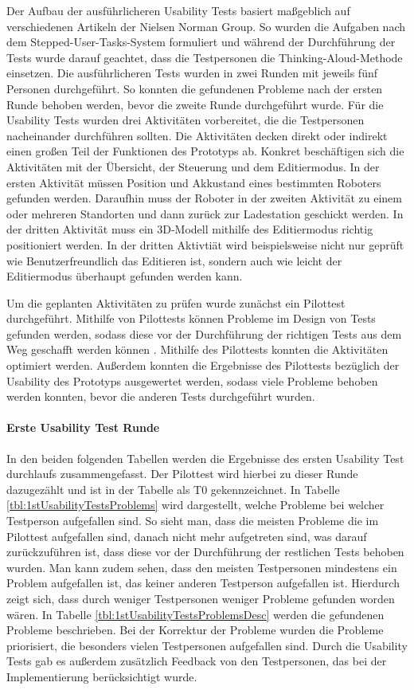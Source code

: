 Der Aufbau der ausführlicheren Usability Tests basiert maßgeblich auf verschiedenen Artikeln der Nielsen Norman Group. So wurden die Aufgaben nach dem Stepped-User-Tasks-System \cite{Pernice.2020} formuliert und während der Durchführung der Tests wurde darauf geachtet, dass die Testpersonen die Thinking-Aloud-Methode \cite{Nielsen.2012b} einsetzen. Die ausführlicheren Tests wurden in zwei Runden mit jeweils fünf Personen durchgeführt. So konnten die gefundenen Probleme nach der ersten Runde behoben werden, bevor die zweite Runde durchgeführt wurde. Für die Usability Tests wurden drei Aktivitäten vorbereitet, die die Testpersonen nacheinander durchführen sollten. Die Aktivitäten decken direkt oder indirekt einen großen Teil der Funktionen des Prototyps ab. Konkret beschäftigen sich die Aktivitäten mit der Übersicht, der Steuerung und dem Editiermodus. In der ersten Aktivität müssen Position und Akkustand eines bestimmten Roboters gefunden werden. Daraufhin muss der Roboter in der zweiten Aktivität zu einem oder mehreren Standorten und dann zurück zur Ladestation geschickt werden. In der dritten Aktivität muss ein 3D-Modell mithilfe des Editiermodus richtig positioniert werden. In der dritten Aktivtiät wird beispielsweise nicht nur geprüft wie Benutzerfreundlich das Editieren ist, sondern auch wie leicht der Editiermodus überhaupt gefunden werden kann.

Um die geplanten Aktivitäten zu prüfen wurde zunächst ein Pilottest durchgeführt. Mithilfe von Pilottests können Probleme im Design von Tests gefunden werden, sodass diese vor der Durchführung der richtigen Tests aus dem Weg geschafft werden können \cite{Schade.2015}. Mithilfe des Pilottests konnten die Aktivitäten optimiert werden. Außerdem konnten die Ergebnisse des Pilottests bezüglich der Usability des Prototyps ausgewertet werden, sodass viele Probleme behoben werden konnten, bevor die anderen Tests durchgeführt wurden.

\paragraph{Erste Usability Test Runde}

In den beiden folgenden Tabellen werden die Ergebnisse des ersten Usability Test durchlaufs zusammengefasst. Der Pilottest wird hierbei zu dieser Runde dazugezählt und ist in der Tabelle als T0 gekennzeichnet. In Tabelle \ref{tbl:1stUsabilityTestsProblems} wird dargestellt, welche Probleme bei welcher Testperson aufgefallen sind. So sieht man, dass die meisten Probleme die im Pilottest aufgefallen sind, danach nicht mehr aufgetreten sind, was darauf zurückzuführen ist, dass diese vor der Durchführung der restlichen Tests behoben wurden. Man kann zudem sehen, dass den meisten Testpersonen mindestens ein Problem aufgefallen ist, das keiner anderen Testperson aufgefallen ist. Hierdurch zeigt sich, dass durch weniger Testpersonen weniger Probleme gefunden worden wären. In Tabelle \ref{tbl:1stUsabilityTestsProblemsDesc} werden die gefundenen Probleme beschrieben. Bei der Korrektur der Probleme wurden die Probleme priorisiert, die besonders vielen Testpersonen aufgefallen sind. Durch die Usability Tests gab es außerdem zusätzlich Feedback von den Testpersonen, das bei der Implementierung berücksichtigt wurde.

